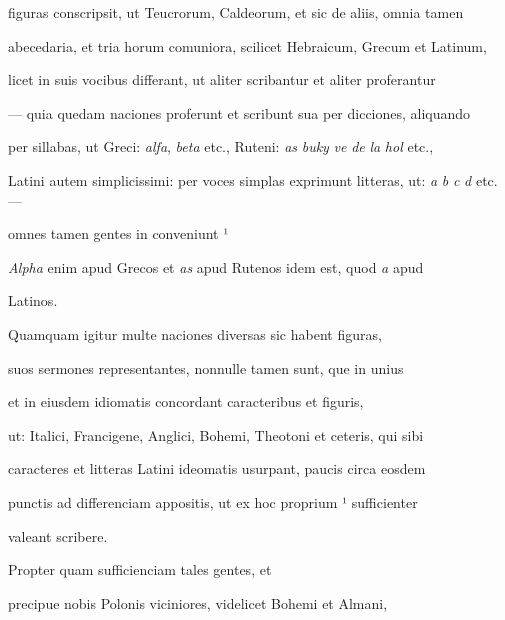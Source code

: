 figuras conscripsit, ut Teucrorum, Caldeorum, et sic de aliis, omnia tamen

abecedaria, et tria horum comuniora, scilicet Hebraicum, Grecum et Latinum,

licet in suis vocibus differant, ut aliter scribantur et aliter proferantur

— quia quedam naciones proferunt et scribunt sua per dicciones, aliquando

per sillabas, ut Greci: \textit{alfa}, \textit{beta} etc., Ruteni: \textit{as} \textit{buky} \textit{ve} \textit{de} \textit{la} \textit{hol} etc.,

Latini autem simplicissimi: per voces simplas exprimunt litteras, ut: \textit{a} \textit{b} \textit{c} \textit{d} etc. —



omnes tamen gentes in  conveniunt  ¹

\textit{Alpha} enim apud Grecos et \textit{as} apud Rutenos idem est, quod \textit{a} apud

\splitlines{}

Latinos.

\indentK Quamquam igitur multe naciones diversas sic habent figuras,

\fulllines{}

suos sermones representantes, nonnulle tamen sunt, que in unius

et in eiusdem idiomatis concordant caracteribus et figuris,

ut: Italici, Francigene, Anglici, Bohemi, Theotoni et ceteris, qui sibi

caracteres et litteras Latini ideomatis usurpant, paucis circa eosdem

punctis ad differenciam appositis, ut ex hoc proprium ¹ sufficienter

\splitlines{}


valeant scribere.

\indentK Propter quam sufficienciam tales gentes, et

\fulllines{}

precipue nobis Polonis viciniores, videlicet Bohemi et Almani,

